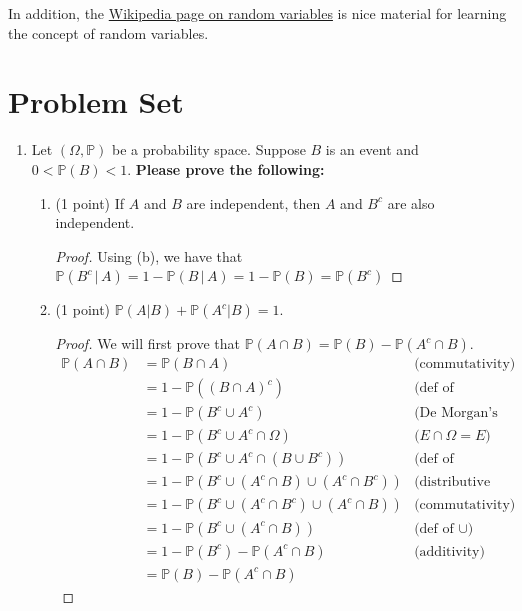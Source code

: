 \documentclass[11pt]{article}
\newcommand{\p}{\mathbb{P}}
\begin{document}
In addition, the \href{https://en.wikipedia.org/wiki/Random_variable}{Wikipedia page on random variables} is nice material for learning the concept of random variables.

\section{Problem Set}

\begin{enumerate}

\item Let $(\Omega,\mathbb{P})$ be a probability space. Suppose $B$ is an event and $0<\mathbb{P}(B)<1$. \textbf{Please prove the following:}
\begin{enumerate}
\item (1 point) If $A$ and $B$ are independent, then $A$ and $B^c$ are also independent. 

\begin{proof}
    Using (b), we have that \(\p(B^c\,|\,A)=1-\p(B\,|\,A)=1-\p(B)=\p(B^c)\)
\end{proof}

\item (1 point) $\mathbb{P}(A|B) + \mathbb{P}(A^c| B) = 1$.

\begin{proof}
    We will first prove that \(\p(A\cap B) = \p(B)-\p(A^c\cap B)\).
    \begin{align*}
        \p(A\cap B) &= \p(B\cap A) & \text{(commutativity)}\\
        &= 1-\p((B\cap A)^c) & \text{(def of complement)}\\
        &= 1-\p(B^c\cup A^c) & \text{(De Morgan's Law)}\\
        &= 1 - \p(B^c\cup A^c \cap \Omega) & \text{(\(E\cap\Omega = E\))}\\
        &= 1 - \p(B^c\cup A^c \cap (B\cup B^c)) & \text{(def of complement)}\\
        &= 1 - \p(B^c\cup (A^c\cap B)\cup (A^c\cap B^c)) &\text{(distributive law)}\\
        &= 1 - \p(B^c\cup (A^c\cap B^c)\cup (A^c\cap B)) & \text{(commutativity)}\\
        &= 1 - \p(B^c\cup (A^c\cap B)) & \text{(def of \(\cup\))}\\
        &= 1 - \p(B^c) - \p(A^c\cap B) & \text{(additivity)}\\
        &= \p(B) - \p(A^c\cap B)
    \end{align*}


\end{proof}
\end{enumerate}
\end{enumerate}
\end{document}
